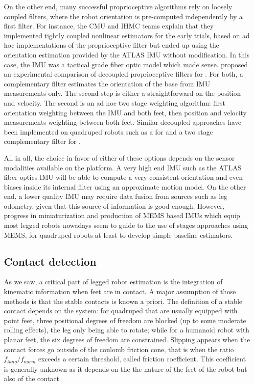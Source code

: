 On the other end, many successful proprioceptive algorithms rely on loosely coupled filters, where the robot orientation is pre-computed
independently by a first filter. For instance, the CMU \cite{feng2015optimization} and IHMC \cite{johnson2015team} teams explain that they
implemented tightly coupled nonlinear estimators for the early trials, based on ad hoc implementations of the proprioceptive filter but ended up using 
the orientation estimation provided by the ATLAS IMU without modification. In this case, the IMU was a tactical grade fiber optic model which made sense. 
\cite{flayols2017experimental} proposed an experimental comparison of decoupled proprioceptive filters for . For both, a complementary filter estimates 
the orientation of the base from IMU measurements only. The second step is either a straightforward \KalmanF on the position and velocity. 
The second is an ad hoc two stage weighting algorithm: first orientation weighting between the IMU and both feet, then position and velocity measurements 
weighting between both feet. Similar decoupled approaches have been implemented on quadruped robots such as a \KalmanF for \cite{bledt2018cheetah} and a two 
stage complementary filter for \cite{leziart2021implementation}.

All in all, the choice in favor of either of these options depends on the sensor modalities available on the platform. A very high end IMU such as the ATLAS fiber optics
IMU will be able to compute a very consistent orientation and even biases inside its internal filter using an approximate motion model. On the other end,
a lower quality IMU may require data fusion from sources such as leg odometry, given that this source of information is good enough. However, progress in 
miniaturization and production of MEMS based IMUs which equip most legged robots nowadays seem to guide to the use of stages approaches using MEMS, 
for quadruped robots at least \cite{bledt2018cheetah, leziart2021implementation} to develop simple baseline estimators.





\subsection{Contact detection}
As we saw, a critical part of legged robot estimation is the integration of kinematic information when feet are in contact. A major
assumption of those methods is that the stable contacts is known a priori. The definition of a stable contact depends on the system: for quadruped that 
are usually equipped with point feet, three positional degrees of freedom are blocked (up to some moderate rolling effects), the leg only being able to rotate; while for a humanoid robot with
planar feet, the six degrees of freedom are constrained. Slipping appears when the contact forces go outside of the coulomb friction cone, that is when the ratio $f_{tang}/f_{norm}$
exceeds a certain threshold, called friction coefficient. This coefficient is generally unknown as it depends on the the nature of the feet of the robot but also of the contact.


